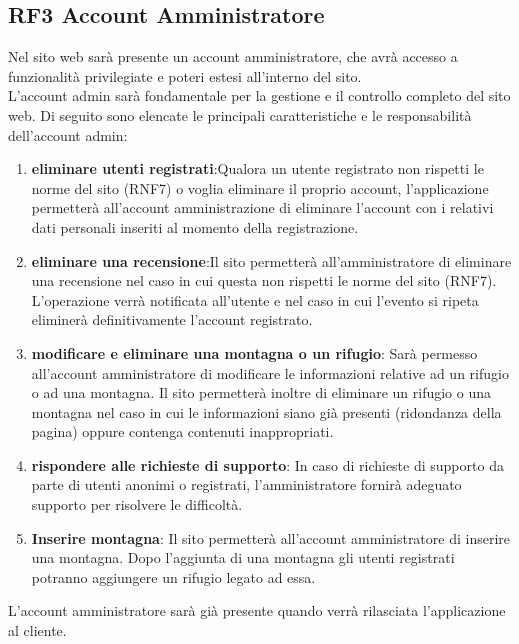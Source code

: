 \documentclass[a4paper,12pt]{article}
\begin{document}
\subsection*{RF3 Account Amministratore}
Nel sito web sarà presente un account amministratore, che avrà accesso a funzionalità privilegiate e poteri estesi all'interno del sito.\\
L'account admin sarà fondamentale per la gestione e il controllo completo del sito web. Di seguito sono elencate le principali caratteristiche e le responsabilità dell'account admin:
 \begin{enumerate} [leftmargin=40pt]
     \item \textbf{eliminare utenti registrati}:\newline Qualora un utente registrato non rispetti le norme del sito (RNF7) o voglia eliminare il proprio account, l'applicazione permetterà all'account amministrazione di eliminare l'account con i relativi dati personali inseriti al momento della registrazione.
     \item \textbf{eliminare una recensione}:\newline Il sito permetterà all'amministratore di eliminare una recensione nel caso in cui questa non rispetti le norme del sito (RNF7). L'operazione verrà notificata all'utente e nel caso in cui l'evento si ripeta eliminerà definitivamente l'account registrato. 
     \item \textbf{modificare e eliminare una montagna o un rifugio}:\newline
    Sarà permesso all'account amministratore di modificare le informazioni relative ad un rifugio o ad una montagna. Il sito permetterà inoltre di eliminare un rifugio o una montagna nel caso in cui le informazioni siano già presenti (ridondanza della pagina) oppure contenga contenuti inappropriati. 
    \item \textbf{rispondere alle richieste di supporto}:\newline
    In caso di richieste di supporto da parte di utenti anonimi o registrati, l'amministratore fornirà adeguato supporto per risolvere le difficoltà.
     \item \textbf{Inserire montagna}:\newline
    Il sito permetterà all'account amministratore di inserire una montagna. Dopo l'aggiunta di una montagna gli utenti registrati potranno aggiungere un rifugio legato ad essa. 
    
    
 
 \end{enumerate}
 L'account amministratore sarà già presente quando verrà rilasciata l'applicazione al cliente. 
\end{document}
